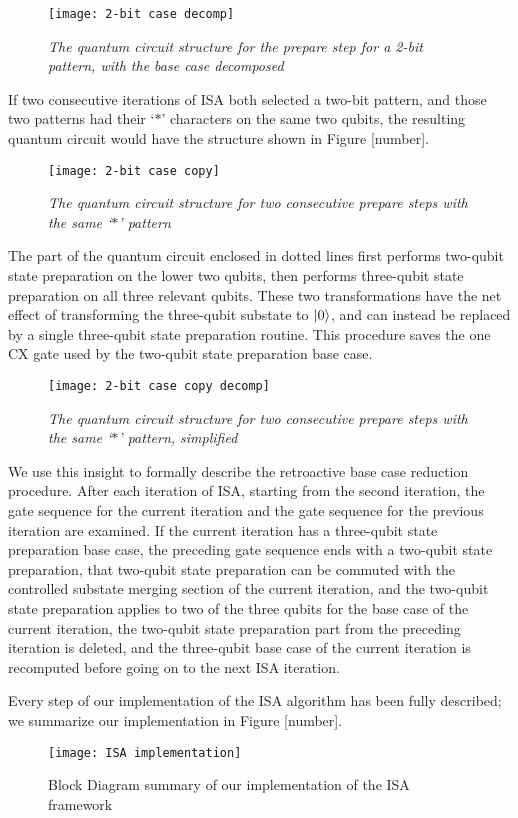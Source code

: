 \documentclass{article}
\begin{document}
\begin{figure}[H]
\centering
\texttt{[image: 2-bit case decomp]}
\caption{\textit{The quantum circuit structure for the prepare step for a 2-bit pattern, with the base case decomposed}}
\end{figure}

If two consecutive iterations of ISA both selected a two-bit pattern, and those
two patterns had their `$*$' characters on the same two qubits, the resulting
quantum circuit would have the structure shown in Figure [number].

\begin{figure}[H]
\centering
\texttt{[image: 2-bit case copy]}
\caption{\textit{The quantum circuit structure for two consecutive prepare steps
with the same `$*$' pattern}}
\end{figure}

The part of the quantum circuit enclosed in dotted lines first performs
two-qubit state preparation on the lower two qubits, then performs three-qubit
state preparation on all three relevant qubits. These two transformations have
the net effect of transforming the three-qubit substate to $\mathinner{|{0}\rangle}$, and can
instead be replaced by a single three-qubit state preparation routine. This
procedure saves the one CX gate used by the two-qubit state preparation base 
case.

\begin{figure}[H]
\centering
\texttt{[image: 2-bit case copy decomp]}
\caption{\textit{The quantum circuit structure for two consecutive prepare steps
with the same `$*$' pattern, simplified}}
\end{figure}

We use this insight to formally describe the retroactive base case reduction
procedure. After each iteration of ISA, starting from the second iteration, 
the gate sequence for the current iteration and the gate sequence for the
previous iteration are examined. If the current iteration has a three-qubit
state preparation base case, the preceding gate sequence ends with a
two-qubit state preparation, that two-qubit state preparation can be commuted 
with the controlled substate merging section of the current iteration, and the
two-qubit state preparation applies to two of the three qubits for the base case
of the current iteration, the two-qubit state preparation part from the
preceding iteration is deleted, and the three-qubit base case of the current
iteration is recomputed before going on to the next ISA iteration.

Every step of our implementation of the ISA algorithm has been fully described;
we summarize our implementation in Figure [number].

\begin{figure}[H]
\centering
\texttt{[image: ISA implementation]}
\caption{Block Diagram summary of our implementation of the ISA framework}
\end{figure}
\end{document}
